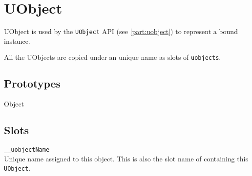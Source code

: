 
\section{UObject}

UObject is used by the \lstinline|UObject| API (see
\autoref{part:uobject}) to represent a bound \Cxx instance.

All the UObjects are copied under an unique name as slots of
\lstinline{uobjects}.

\subsection{Prototypes}
\begin{refObjects}
\item[Object]
\end{refObjects}

\subsection{Slots}

\begin{urbiscriptapi}
\item \lstinline|__uobjectName| \\
  Unique name assigned to this object. This is also the slot name of
   containing this \lstinline|UObject|.
\end{urbiscriptapi}

